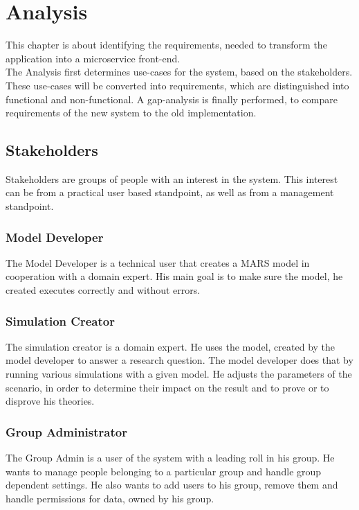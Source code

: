 
\chapter{Analysis}
This chapter is about identifying the requirements, needed to transform the application into a microservice front-end.\\
The Analysis first determines use-cases for the system, based on the stakeholders. These use-cases will be converted into requirements, which are distinguished into functional and non-functional. A gap-analysis is finally performed, to compare requirements of the new system to the old implementation. 


\section{Stakeholders}
Stakeholders are groups of people with an interest in the system. This interest can be from a practical user based standpoint, as well as from a management standpoint.

\subsection{Model Developer}
The Model Developer is a technical user that creates a MARS model in cooperation with a domain expert. His main goal is to make sure the model, he created executes correctly and without errors.

\subsection{Simulation Creator}
The simulation creator is a domain expert. He uses the model, created by the model developer to answer a research question. The model developer does that by running various simulations with a given model. He adjusts the parameters of the scenario, in order to determine their impact on the result and to prove or to disprove his theories.

\subsection{Group Administrator}
The Group Admin is a user of the system with a leading roll in his group. He wants to manage people belonging to a particular group and handle group dependent settings. He also wants to add users to his group, remove them and handle permissions for data, owned by his group.


